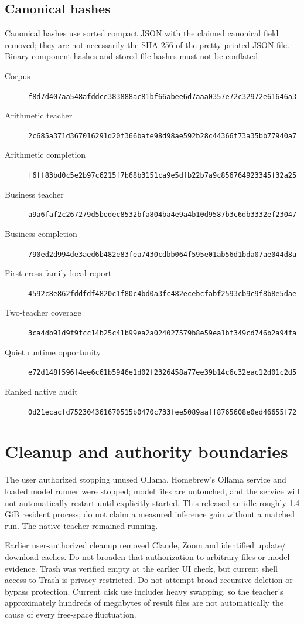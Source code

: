 \documentclass[11pt,a4paper]{article}
\begin{document}
\subsection{Canonical hashes}
Canonical hashes use sorted compact JSON with the claimed canonical field
removed; they are not necessarily the SHA-256 of the pretty-printed JSON file.
Binary component hashes and stored-file hashes must not be conflated.
\begin{description}
\item[Corpus] \nolinkurl{f8d7d407aa548afddce383888ac81bf66abee6d7aaa0357e72c32972e61646a3}
\item[Arithmetic teacher] \nolinkurl{2c685a371d367016291d20f366bafe98d98ae592b28c44366f73a35bb77940a7}
\item[Arithmetic completion] \nolinkurl{f6ff83bd0c5e2b97c6215f7b68b3151ca9e5dfb22b7a9c856764923345f32a25}
\item[Business teacher] \nolinkurl{a9a6faf2c267279d5bedec8532bfa804ba4e9a4b10d9587b3c6db3332ef23047}
\item[Business completion] \nolinkurl{790ed2d994de3aed6b482e83fea7430cdbb064f595e01ab56d1bda07ae044d8a}
\item[First cross-family local report] \nolinkurl{4592c8e862fddfdf4820c1f80c4bd0a3fc482ecebcfabf2593cb9c9f8b8e5dae}
\item[Two-teacher coverage] \nolinkurl{3ca4db91d9f9fcc14b25c41b99ea2a024027579b8e59ea1bf349cd746b2a94fa}
\item[Quiet runtime opportunity] \nolinkurl{e72d148f596f4ee6c61b5946e1d02f2326458a77ee39b14c6c32eac12d01c2d5}
\item[Ranked native audit] \nolinkurl{0d21ecacfd752304361670515b0470c733fee5089aaff8765608e0ed46655f72}
\end{description}

\section{Cleanup and authority boundaries}
The user authorized stopping unused Ollama. Homebrew's Ollama service and
loaded model runner were stopped; model files are untouched, and the service
will not automatically restart until explicitly started. This released an
idle roughly 1.4 GiB resident process; do not claim a measured inference gain
without a matched run. The native teacher remained running.

Earlier user-authorized cleanup removed Claude, Zoom and identified update/
download caches. Do not broaden that authorization to arbitrary files or
model evidence. Trash was verified empty at the earlier UI check, but current
shell access to Trash is privacy-restricted. Do not attempt broad recursive
deletion or bypass protection. Current disk use includes heavy swapping, so
the teacher's approximately hundreds of megabytes of result files are not
automatically the cause of every free-space fluctuation.
\end{document}
